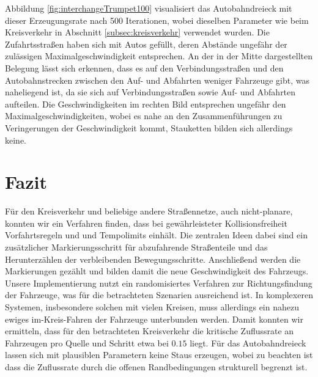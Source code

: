 \documentclass[10pt, a4paper]{article}
\newcommand\myref[1]{\ref{#1} (S. \pageref{#1})}
\newcommand\myrefcomma[1]{\ref{#1}, S. \pageref{#1}}
\begin{document}
Abbildung \ref{fig:interchangeTrumpet100} visualisiert das Autobahndreieck mit dieser Erzeugungsrate nach 500 Iterationen, wobei dieselben Parameter wie beim Kreisverkehr in Abschnitt \ref{subsec:kreisverkehr} verwendet wurden. Die Zufahrtsstraßen haben sich mit Autos gefüllt, deren Abstände ungefähr der zulässigen Maximalgeschwindigkeit entsprechen. An der in der Mitte dargestellten Belegung lässt sich erkennen, dass es auf den Verbindungsstraßen und den Autobahnstrecken zwischen den Auf- und Abfahrten weniger Fahrzeuge gibt, was naheliegend ist, da sie sich auf Verbindungsstraßen sowie Auf- und Abfahrten aufteilen. Die Geschwindigkeiten im rechten Bild entsprechen ungefähr den Maximalgeschwindigkeiten, wobei es nahe an den Zusammenführungen zu Veringerungen der Geschwindigkeit kommt, Stauketten bilden sich allerdings keine.

\newpage
\section{Fazit}
\label{sec:fazit}

Für den Kreisverkehr und beliebige andere Straßennetze, auch nicht-planare, konnten wir ein Verfahren finden, dass bei gewährleisteter Kollisionsfreiheit Vorfahrtsregeln und und Tempolimits einhält. Die zentralen Ideen dabei sind ein zusätzlicher Markierungsschritt für abzufahrende Straßenteile und das Herunterzählen der verbleibenden Bewegungsschritte. Anschließend werden die Markierungen gezählt und bilden damit die neue Geschwindigkeit des Fahrzeugs. Unsere Implementierung nutzt ein randomisiertes Verfahren zur Richtungsfindung der Fahrzeuge, was für die betrachteten Szenarien ausreichend ist. In komplexeren Systemen, insbesondere solchen mit vielen Kreisen, muss allerdings ein nahezu ewiges im-Kreis-Fahren der Fahrzeuge unterbunden werden. Damit konnten wir ermitteln, dass für den betrachteten Kreisverkehr die kritische Zuflussrate an Fahrzeugen pro Quelle und Schritt etwa bei $0.15$ liegt. Für das Autobahndreieck lassen sich mit plausiblen Parametern keine Staus erzeugen, wobei zu beachten ist dass die Zuflussrate durch die offenen Randbedingungen strukturell begrenzt ist.


{}

\end{document}
